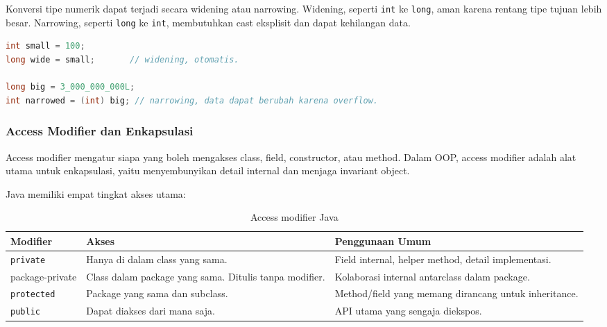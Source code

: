 Konversi tipe numerik dapat terjadi secara widening atau narrowing. Widening, seperti \texttt{int} ke \texttt{long}, aman karena rentang tipe tujuan lebih besar. Narrowing, seperti \texttt{long} ke \texttt{int}, membutuhkan cast eksplisit dan dapat kehilangan data.

\begin{lstlisting}[language=Java, caption={Widening dan narrowing conversion}, label={lst:casting-java}]
int small = 100;
long wide = small;       // widening, otomatis.

long big = 3_000_000_000L;
int narrowed = (int) big; // narrowing, data dapat berubah karena overflow.
\end{lstlisting}

\subsubsection{Access Modifier dan Enkapsulasi}

\begin{jawab}
Access modifier mengatur siapa yang boleh mengakses class, field, constructor, atau method. Dalam OOP, access modifier adalah alat utama untuk enkapsulasi, yaitu menyembunyikan detail internal dan menjaga invariant object.
\end{jawab}

Java memiliki empat tingkat akses utama:

\begin{table}[H]
\centering
\begin{tabularx}{\textwidth}{|L{0.18\textwidth}|L{0.22\textwidth}|X|}
\hline
\textbf{Modifier} & \textbf{Akses} & \textbf{Penggunaan Umum} \\
\hline
\texttt{private} & Hanya di dalam class yang sama. & Field internal, helper method, detail implementasi. \\
\hline
package-private & Class dalam package yang sama. Ditulis tanpa modifier. & Kolaborasi internal antarclass dalam package. \\
\hline
\texttt{protected} & Package yang sama dan subclass. & Method/field yang memang dirancang untuk inheritance. \\
\hline
\texttt{public} & Dapat diakses dari mana saja. & API utama yang sengaja diekspos. \\
\hline
\end{tabularx}
\caption{Access modifier Java}
\label{tab:access-modifier-java}
\end{table}

